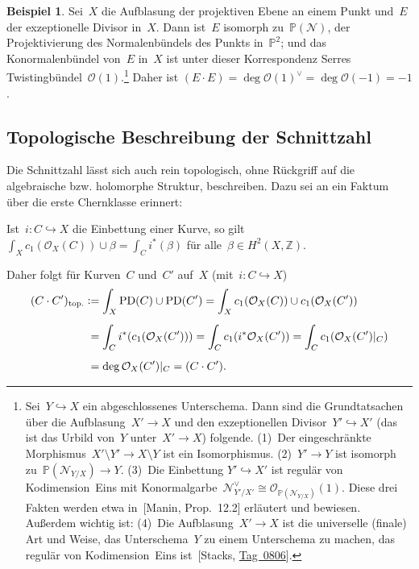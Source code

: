 \documentclass[a4paper,ngerman,12pt]{scrartcl}
\theoremstyle{definition}
\newtheorem{ex}[defn]{Beispiel}
\theoremstyle{plain}
\theoremstyle{remark}
\newcommand{\ZZ}{\mathbb{Z}}
\newcommand{\PP}{\mathbb{P}}
\newcommand{\N}{\mathcal{N}}
\renewcommand{\O}{\mathcal{O}}
\newcommand{\PD}{\operatorname{PD}}
\newcommand{\defeq}{\vcentcolon=}
\begin{document}
\begin{ex}Sei~$X$ die Aufblasung der projektiven Ebene an einem Punkt und~$E$
der exzeptionelle Divisor in~$X$. Dann ist~$E$ isomorph zu~$\PP(\N)$, der
Projektivierung des Normalenbündels des Punkts in~$\PP^2$; und das Konormalenbündel
von~$E$ in~$X$ ist unter dieser Korrespondenz Serres
Twistingbündel~$\O(1)$.\footnote{Sei~$Y \hookrightarrow X$ ein abgeschlossenes
Unterschema. Dann sind die Grundtatsachen über die Aufblasung~$X' \to X$
und den exzeptionellen Divisor~$Y' \hookrightarrow X'$ (das ist das Urbild
von~$Y$ unter~$X' \to X$) folgende. (1)~Der eingeschränkte Morphismus~$X'
\setminus Y' \to X \setminus Y$ ist ein Isomorphismus. (2)~$Y' \to Y$ ist
isomorph zu~$\PP(\N_{Y/X}) \to Y$. (3)~Die Einbettung $Y' \hookrightarrow X'$
ist regulär von Kodimension~Eins mit Konormalgarbe~$\N_{Y'/X'}^\vee \cong
\O_{\PP(\N_{Y/X})}(1)$. Diese drei Fakten werden etwa in~[Manin, Prop.~12.2]
erläutert und bewiesen. Außerdem wichtig ist:
(4)~Die Aufblasung~$X' \to X$ ist die universelle
(finale) Art und Weise, das Unterschema~$Y$ zu einem Unterschema zu machen, das regulär
von Kodimension~Eins ist~[Stacks,
\href{http://stacks.math.columbia.edu/tag/0806}{Tag~0806}].} Daher ist
$(E \cdot E) = \deg \O(1)^\vee = \deg \O(-1) = -1$.
\end{ex}


\subsection*{Topologische Beschreibung der Schnittzahl}

Die Schnittzahl lässt sich auch rein topologisch, ohne Rückgriff auf
die algebraische bzw. holomorphe Struktur, beschreiben. Dazu sei an ein Faktum
über die erste Chernklasse erinnert:

\begin{fact}Ist~$i : C \hookrightarrow X$ die
Einbettung einer Kurve, so gilt~$\int_X c_1(\O_X(C)) \cup \beta = \int_C
i^*(\beta)$ für alle~$\beta \in H^2(X,\ZZ)$.
\end{fact}

Daher folgt für Kurven~$C$ und~$C'$ auf~$X$ (mit~$i : C \hookrightarrow X$)
\begin{align*}
  (C \cdot C')_{\text{top.}}
  &\defeq \int_X \PD(C) \cup \PD(C')
  = \int_X c_1(\O_X(C)) \cup c_1(\O_X(C')) \\[0.5em]
  &\phantom{:}= \int_C i^*(c_1(\O_X(C')))
  = \int_C c_1(i^*\O_X(C'))
  = \int_C c_1(\O_X(C')|_C) \\[0.5em]
  &\phantom{:}= \deg \O_X(C')|_C
  = (C \cdot C').
\end{align*}
\end{document}
